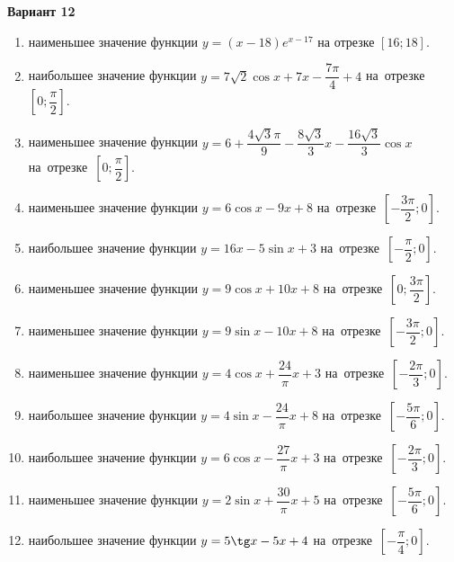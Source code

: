 \documentclass[a4paper,10pt]{article}
\begin{document}
\begin{center}\Large\textbf{Вариант 12}\end{center}

\begin{enumerate}
\item {} наименьшее значение функции $y=\left(x-18\right)e^{x-17}$ на отрезке $\left[16;18\right]$.

\item {} наибольшее значение функции $y=7\sqrt{2}\cos x+7x-\dfrac{7\pi }{4}+4$ на~отрезке~$\left[0;\dfrac{\pi }{2}\right]$.

\item {} наименьшее значение функции $y=6+\dfrac{4\sqrt{3}\pi }{9}-\dfrac{8\sqrt{3}}{3}x-\dfrac{16\sqrt{3}}{3}\cos x$ на~отрезке~$\left[0;\dfrac{\pi }{2}\right]$.

\item {} наименьшее значение функции $y=6\cos x-9x+8$ на~отрезке~$\left[-\dfrac{3\pi }{2};0\right]$.

\item {} наибольшее значение функции $y=16x-5\sin x+3$ на~отрезке~$\left[-\dfrac{\pi }{2};0\right]$.

\item {} наименьшее значение функции $y=9\cos x+10x+8$ на~отрезке~$\left[0;\dfrac{3\pi }{2}\right]$.

\item {} наименьшее значение функции $y=9\sin x-10x+8$ на~отрезке~$\left[-\dfrac{3\pi }{2};0\right]$.

\item {} наименьшее значение функции $y=4\cos x+\dfrac{24}{\pi }x+3$ на~отрезке~$\left[-\dfrac{2\pi }{3};0\right]$.

\item {} наибольшее значение функции $y=4\sin x-\dfrac{24}{\pi }x+8$ на~отрезке~$\left[-\dfrac{5\pi }{6};0\right]$.

\item {} наибольшее значение функции $y=6\cos x-\dfrac{27}{\pi }x+3$ на~отрезке~$\left[-\dfrac{2\pi }{3};0\right]$.

\item {} наименьшее значение функции $y=2\sin x+\dfrac{30}{\pi }x+5$ на~отрезке~$\left[-\dfrac{5\pi }{6};0\right]$.

\item {} наибольшее значение функции $y=5\tg x-5x+4$ на~отрезке~$\left[-\dfrac{\pi }{4};0\right]$.


\end{enumerate}
\end{document}
